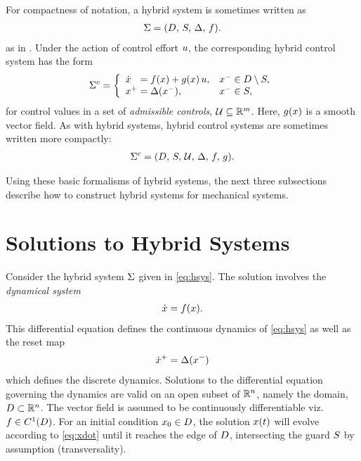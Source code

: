%
For compactness of notation, a hybrid system is sometimes written as
\begin{align*}
  \Sigma = (D, \, S, \, \Delta, \, f).
\end{align*}
as in \cite{Sinnet2009}.
%
Under the action of control effort $u$, the corresponding hybrid control
system has the form
%
\begin{align}
  \HCS = \left\{
  \begin{array}{l l}
    \dx\hphantom{^{+}} = \xf\arx + \xg\arx \, \uu, & \xm \in \D \setminus \Guard,\\
    \xp = \Delta(\xm), & \xm \in \Guard,
  \end{array}\right.
  \label{eq:hcsys}
\end{align}
%
for control values in a set of {\em admissible controls}, $\mathcal{U} \subseteq
\mathbb{R}^{m}$.
%
Here, $g(x)$ is a smooth vector field.
%
As with hybrid systems, hybrid control systems are sometimes written more
compactly:
%
\begin{align*}
  \Sigma^{c} = (D, \, S, \, \mathcal{U}, \, \Delta, \, f, \, g).
\end{align*}

Using these basic formalisms of hybrid systems, the next three subsections
describe how to construct hybrid systems for mechanical systems.


\section{Solutions to Hybrid Systems} \label{sec:hsys-sol}

Consider the hybrid system $\Sigma$ given in \eqref{eq:hsys}.
%
The solution involves the {\em dynamical system}
\begin{align}
  \label{eq:xdot}
  {\dot {x}} = f(x).
\end{align}
This differential equation defines the continuous dynamics of \eqref{eq:hsys} as
well as the reset map
\begin{align}
  \label{eq:rmap}
  {\dot {x}}^{+} = \Delta(x^{-})
\end{align}
which defines the discrete dynamics.
%
Solutions to the differential equation governing the dynamics are valid on an
open subset of $\mathbb{R}^{n}$, namely the domain, $D \subset \mathbb{R}^{n}$.
%
The vector field is assumed to be continuously differentiable viz. $f \in
C^{1}(D)$.
%
For an initial condition $x_{0} \in D$, the solution $x(t)$ will evolve
according to \eqref{eq:xdot} until it reaches the edge of $D$, intersecting
the guard $S$ by assumption (transversality).

